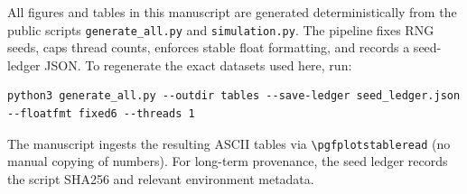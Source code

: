 \documentclass[aps,prd,preprint,onecolumn,superscriptaddress,nofootinbib,longbibliography,floatfix,11pt,showpacs,showkeys]{revtex4-2}
\theoremstyle{plain}
\theoremstyle{definition}
\theoremstyle{remark}
\begin{document}
All figures and tables in this manuscript are generated deterministically from the public scripts \texttt{generate\_all.py} and \texttt{simulation.py}. The pipeline fixes RNG seeds, caps thread counts, enforces stable float formatting, and records a seed-ledger JSON. To regenerate the exact datasets used here, run:
\begin{lstlisting}[basicstyle=\ttfamily\small,breaklines=true,columns=fullflexible]
python3 generate_all.py --outdir tables --save-ledger seed_ledger.json --floatfmt fixed6 --threads 1
\end{lstlisting}
The manuscript ingests the resulting ASCII tables via \verb|\pgfplotstableread| (no manual
copying of numbers). For long-term provenance, the seed ledger records the script SHA256 and
relevant environment metadata.



\end{document}
